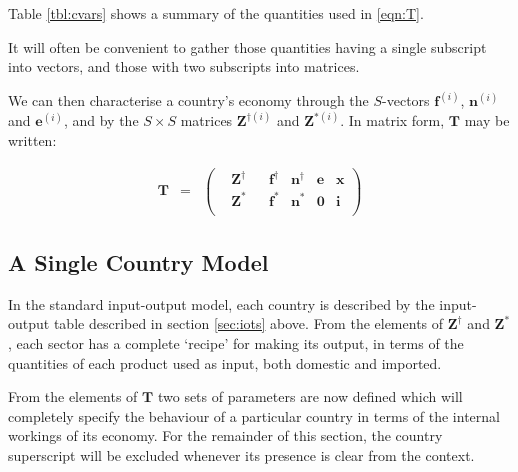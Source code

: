 \documentclass[a4paper]{article}
\begin{document}
Table \ref{tbl:cvars} shows a summary of the quantities used in \eqref{eqn:T}.

It will often be convenient to gather those quantities having a single subscript into vectors, and those with two subscripts into matrices. 

We can then characterise a country's economy through the $S$-vectors $\boldsymbol{f}^{(i)}$, $\boldsymbol{n}^{(i)}$ and $\boldsymbol{e}^{(i)}$, and by the $S\times S$ matrices $\boldsymbol{Z}^{\dagger(i)}$ and $\boldsymbol{Z}^{*(i)}$.
In matrix form, $\boldsymbol{T}$ may be written:

\begin{equation}\label{eqn:Tvectorised}
\begin{array}{rcc}
\boldsymbol{T} & = & 
\left(
	\begin{array}{ccccccc}
 & \boldsymbol{Z}^{\dag} & & \boldsymbol{f}^\dag & \boldsymbol{n}^\dag & \boldsymbol{e} & \boldsymbol{x} \\
 & \boldsymbol{Z}^* & & \boldsymbol{f}^* & \boldsymbol{n}^* & \boldsymbol{0} & \boldsymbol{i} \\
	\end{array} 
\right)
\end{array}
\end{equation}

\subsection{A Single Country Model}\label{sec:countries}
In the standard input-output model, each country is described by the input-output table described in section \ref{sec:iots} above.
From the elements of $\boldsymbol{Z}^\dagger$ and $\boldsymbol{Z}^*$, each sector has a complete `recipe' for making its output, in terms of the quantities of each product used as input, both domestic and imported. 

From the elements of $\boldsymbol{T}$ two sets of parameters are now defined which will completely specify the behaviour of a particular country in terms of the internal workings of its economy. For the remainder of this section, the country superscript will be excluded whenever its presence is clear from the context.
\end{document}
